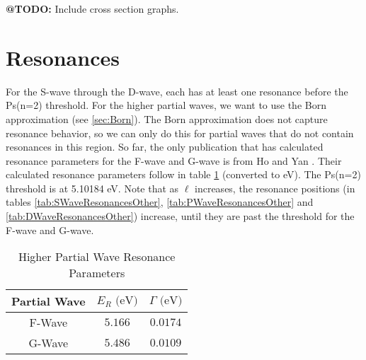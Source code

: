 \documentclass[Dissertation.tex]{subfiles}
\begin{document}
\textbf{@TODO:} Include cross section graphs.


\section{Resonances}
\label{sec:AllResonances}

For the S-wave through the D-wave, each has at least one resonance before the 
Ps(n=2) threshold. For the higher partial waves, we want to use the Born 
approximation (see \ref{sec:Born}). The Born approximation does not capture 
resonance behavior, so we can only do this for partial waves that do not 
contain resonances in this region. So far, the only publication that has 
calculated resonance parameters for the F-wave and G-wave is from Ho and Yan 
\cite{Ho2000}. Their calculated resonance parameters follow in table 
\ref{tab:HigherResonancesOther} (converted to eV). The Ps(n=2) threshold is at 5.10184 eV. Note that as $\ell$ increases, the resonance positions (in tables 
\ref{tab:SWaveResonancesOther}, \ref{tab:PWaveResonancesOther} and
\ref{tab:DWaveResonancesOther}) increase, until they are past the threshold for 
the F-wave and G-wave. 

\setlength{\abovecaptionskip}{6pt}
\setlength{\belowcaptionskip}{6pt}
\begin{table}[H]
\centering
\begin{tabular}{c c c}
\toprule
Partial Wave & $E_R \text{ (eV)}$ & $\Gamma \text{ (eV)}$ \\
\midrule
F-Wave & $5.166$ & $0.0174$ \\
G-Wave & $5.486$ & $0.0109$ \\
\bottomrule
\end{tabular}
\caption{Higher Partial Wave Resonance Parameters}
\label{tab:HigherResonancesOther}
\end{table}
\end{document}
